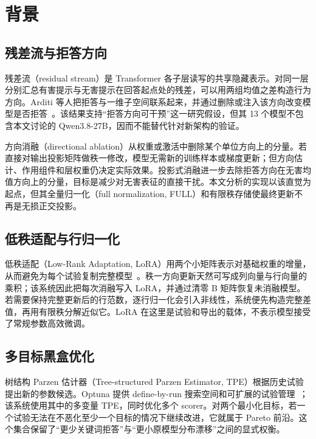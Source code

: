 \section{背景}

\subsection{残差流与拒答方向}

残差流（residual stream）是 Transformer 各子层读写的共享隐藏表示。对同一层分别汇总有害提示与无害提示在回答起点处的残差，可以用两组均值之差构造行为方向。Arditi 等人把拒答与一维子空间联系起来，并通过删除或注入该方向改变模型是否拒答~\cite{arditi2024refusal}。该结果支持“拒答方向可干预”这一研究假设，但其 13 个模型不包含本文讨论的 Qwen3.8-27B，因而不能替代针对新架构的验证。

方向消融（directional ablation）从权重或激活中删除某个单位方向上的分量。若直接对输出投影矩阵做秩一修改，模型无需新的训练样本或梯度更新；但方向估计、作用组件和层权重仍决定实际效果。投影式消融进一步去除拒答方向在无害均值方向上的分量，目标是减少对无害表征的直接干扰。本文分析的实现以该直觉为起点，但其全量归一化（full normalization, FULL）和有限秩存储使最终更新不再是无损正交投影。

\subsection{低秩适配与行归一化}

低秩适配（Low-Rank Adaptation, LoRA）用两个小矩阵表示对基础权重的增量，从而避免为每个试验复制完整模型~\cite{hu2022lora}。秩一方向更新天然可写成列向量与行向量的乘积；该系统因此把每次消融写入 LoRA，并通过清零 B 矩阵恢复未消融模型。若需要保持完整更新后的行范数，逐行归一化会引入非线性，系统便先构造完整差值，再用有限秩分解近似它。LoRA 在这里是试验和导出的载体，不表示模型接受了常规参数高效微调。

\subsection{多目标黑盒优化}

树结构 Parzen 估计器（Tree-structured Parzen Estimator, TPE）根据历史试验提出新的参数候选。Optuna 提供 define-by-run 搜索空间和可扩展的试验管理~\cite{akiba2019optuna}；该系统使用其中的多变量 TPE，同时优化多个 scorer。对两个最小化目标，若一个试验无法在不恶化至少一个目标的情况下继续改进，它就属于 Pareto 前沿。这个集合保留了“更少关键词拒答”与“更小原模型分布漂移”之间的显式权衡。

